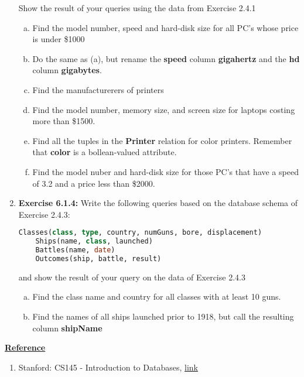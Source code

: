 \documentclass[12pt]{article}
\begin{document}
\begin{enumerate}[1.]
    \bigskip

    Show the result of your queries using the data from Exercise 2.4.1

    \bigskip

    \begin{enumerate}[a)]
        \item Find the model number, speed and hard-disk size for all PC's whose
        price is under \$1000
        \item Do the same as (a), but rename the \textbf{speed} column \textbf{gigahertz}
        and the \textbf{hd} column \textbf{gigabytes}.
        \item Find the manufacturerers of printers
        \item Find the model number, memory size, and screen size for laptops costing
        more than \$1500.
        \item Find all the tuples in the \textbf{Printer} relation for color printers.
        Remember that \textbf{color} is a bollean-valued attribute.
        \item Find the model nuber and hard-disk size for those PC's that have a
        speed of 3.2 and a price less than \$2000.
    \end{enumerate}

    \item \textbf{Exercise 6.1.4:} Write the following queries based on the database
    schema of Exercise 2.4.3:

    \bigskip

    \begin{lstlisting}[language=SQL]
    Classes(class, type, country, numGuns, bore, displacement)
    Ships(name, class, launched)
    Battles(name, date)
    Outcomes(ship, battle, result)
    \end{lstlisting}

    \bigskip

    and show the result of your query on the data of Exercise 2.4.3

    \bigskip

    \begin{enumerate}[a)]
        \item Find the class name and country for all classes with at least 10 guns.
        \item Find the names of all ships launched prior to 1918, but call the resulting
        column \textbf{shipName}

    \end{enumerate}

\end{enumerate}

\bigskip

\underline{\textbf{Reference}}

\bigskip

\begin{enumerate}[1)]
    \item Stanford: CS145 - Introduction to Databases, \href{http://infolab.stanford.edu/~ullman/fcdb/aut07/index.html}{link}
\end{enumerate}
\end{document}
